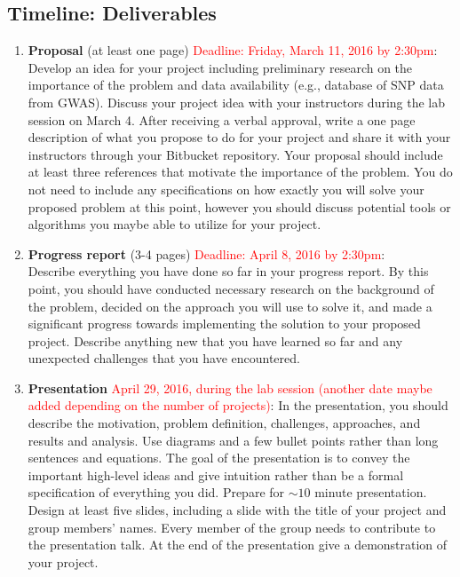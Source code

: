 \subsection*{Timeline: Deliverables}
\begin{enumerate}
\item \textbf{Proposal} (at least one page) \textcolor{red}{Deadline: Friday, March 11, 2016 by 2:30pm}: \\
Develop an idea for your project including preliminary research on the importance of the problem and data availability (e.g., database of SNP data from GWAS). Discuss your project idea with your instructors during the lab session on  March 4. After receiving a verbal approval, write a one page description of what you propose to do for your project and share it with your instructors through your Bitbucket repository. Your proposal should include at least three references that motivate the importance of the problem. You do not need to include any specifications on how exactly you will solve your proposed problem at this point, however you should discuss potential tools or algorithms you maybe able to utilize for your project. 

\item \textbf{Progress report} (3-4 pages) \textcolor{red}{Deadline: April 8, 2016 by 2:30pm}: \\
Describe everything you have done so far in your progress report. By this point, you should have conducted necessary research on the background of the problem, decided on the approach you will use to solve it, and made a significant progress towards implementing the solution to your proposed project. Describe anything new that you have learned so far and any unexpected challenges that you have encountered.

\item \textbf{Presentation} \textcolor{red}{April 29, 2016, during the lab session (another date maybe added depending on the number of projects)}: 
In the presentation, you should describe the motivation, problem definition, challenges, approaches, and results and analysis. Use diagrams and a few bullet points rather than long sentences and equations. The goal of the presentation is to convey the important high-level ideas and give intuition rather than be a formal specification of everything you did. Prepare for $\sim 10$ minute presentation. Design at least five slides, including a slide with the title of your project and group members' names. Every member of the group needs to contribute to the presentation talk. At the end of the presentation give a demonstration of your project.
 

\end{enumerate}
